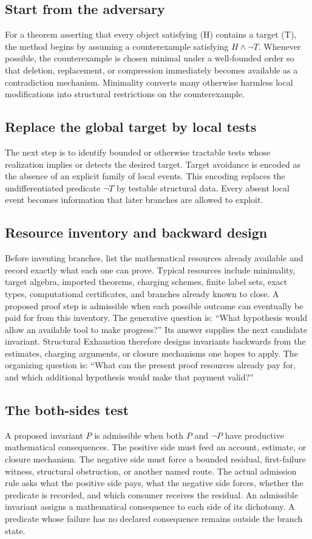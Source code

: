 \documentclass[11pt]{article}
\begin{document}
\subsection{Start from the adversary}
For a theorem asserting that every object satisfying (H) contains a target (T), the method begins by assuming a counterexample satisfying \(H \land \neg T\).
Whenever possible, the counterexample is chosen minimal under a well-founded order so that deletion, replacement, or compression immediately becomes available as a contradiction mechanism.
Minimality converts many otherwise harmless local modifications into structural restrictions on the counterexample.
\subsection{Replace the global target by local tests}
The next step is to identify bounded or otherwise tractable tests whose realization implies or detects the desired target.
Target avoidance is encoded as the absence of an explicit family of local events. This encoding replaces the undifferentiated predicate \(\neg T\) by testable structural data.
Every absent local event becomes information that later branches are allowed to exploit.
\subsection{Resource inventory and backward design}
Before inventing branches, list the mathematical resources already available and record exactly what each one can prove.
Typical resources include minimality, target algebra, imported theorems, charging schemes, finite label sets, exact types, computational certificates, and branches already known to close.
A proposed proof step is admissible when each possible outcome can eventually be paid for from this inventory.
The generative question is: “What hypothesis would allow an available tool to make progress?” Its answer supplies the next candidate invariant.
Structural Exhaustion therefore designs invariants backwards from the estimates, charging arguments, or closure mechanisms one hopes to apply.
The organizing question is: “What can the present proof resources already pay for, and which additional hypothesis would make that payment valid?”
\subsection{The both-sides test}
A proposed invariant \(P\) is admissible when both \(P\) and \(\neg P\) have productive mathematical consequences.
The positive side must feed an account, estimate, or closure mechanism.
The negative side must force a bounded residual, first-failure witness, structural obstruction, or another named route.
The actual admission rule asks what the positive side pays, what the negative side forces, whether the predicate is recorded, and which consumer receives the residual.
An admissible invariant assigns a mathematical consequence to each side of its dichotomy. A predicate whose failure has no declared consequence remains outside the branch state.
\end{document}
